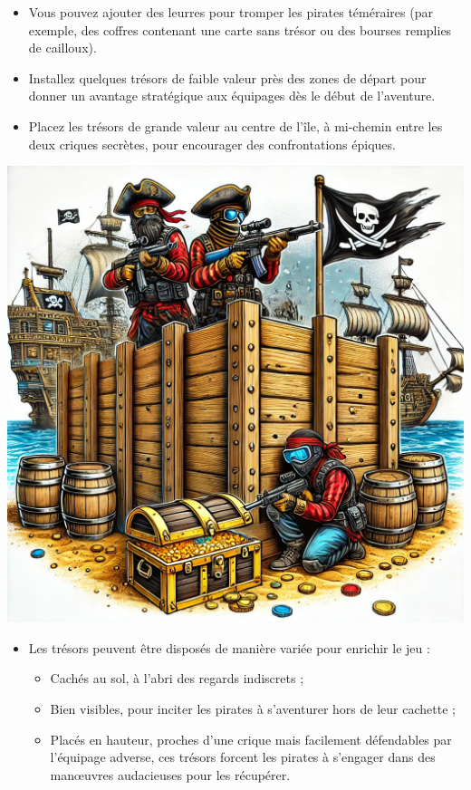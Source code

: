 \documentclass{pirategame}
\begin{document}
\begin{minipage}[t]{0.7\textwidth}
  \textwidth %
  \begin{itemize}[series=repartition]
    \item Vous pouvez ajouter des leurres pour tromper les pirates téméraires (par exemple, des coffres contenant une carte sans trésor ou des bourses remplies de cailloux).
    \item Installez quelques trésors de faible valeur près des zones de départ pour donner un avantage stratégique aux équipages dès le début de l’aventure.
    \item Placez les trésors de grande valeur au centre de l’île, à mi-chemin entre les deux criques secrètes, pour encourager des confrontations épiques.
  \end{itemize}
\end{minipage}
\hfill
\begin{minipage}[t]{0.28\textwidth}
  \vspace{0em}
  \includegraphics[width=\linewidth]{img/orga-planque-tresor.png}
\end{minipage}

\begin{itemize}[resume*=repartition]
  \item Les trésors peuvent être disposés de manière variée pour enrichir le jeu :
  \begin{itemize}
      \item Cachés au sol, à l’abri des regards indiscrets ;
      \item Bien visibles, pour inciter les pirates à s’aventurer hors de leur cachette ;
      \item Placés en hauteur, proches d’une crique mais facilement défendables par l’équipage adverse, ces trésors forcent les pirates à s’engager dans des manœuvres audacieuses pour les récupérer.
  \end{itemize}
\end{itemize}
\end{document}
